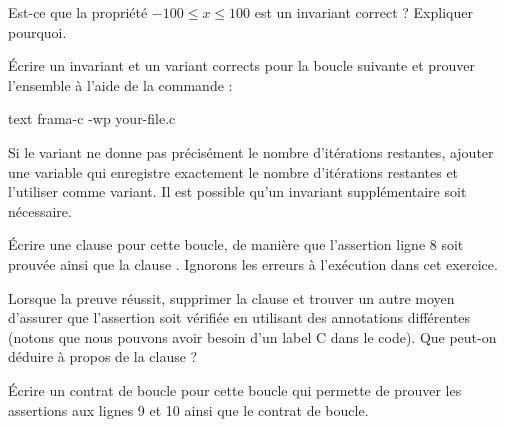 

Est-ce que la propriété $-100 \leq x \leq 100$ est un invariant correct ?
Expliquer pourquoi.





Écrire un invariant et un variant corrects pour la boucle suivante et prouver
l'ensemble à l'aide de la commande :

\begin{CodeBlock}{text}
frama-c -wp your-file.c
\end{CodeBlock}




Si le variant ne donne pas précisément le nombre d'itérations restantes, ajouter
une variable qui enregistre exactement le nombre d'itérations restantes et l'utiliser
comme variant. Il est possible qu'un invariant supplémentaire soit nécessaire.





Écrire une clause  pour cette boucle, de manière que
l'assertion ligne 8 soit prouvée ainsi que la clause .
Ignorons les erreurs à l'exécution dans cet exercice.





Lorsque la preuve réussit, supprimer la clause  et
trouver un autre moyen d'assurer que l'assertion soit vérifiée en utilisant des
annotations différentes (notons que nous pouvons avoir besoin d'un label C dans
le code). Que peut-on déduire à propos de la clause  ?




Écrire un contrat de boucle pour cette boucle qui permette de prouver les
assertions aux lignes 9 et 10 ainsi que le contrat de boucle.


